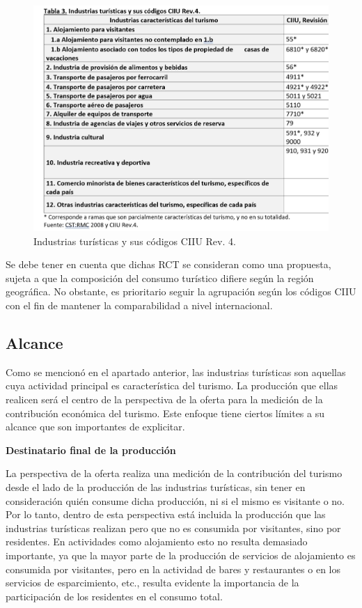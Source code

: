 \documentclass[
  openany]{book}
\begin{document}
\begin{figure}

{\centering \includegraphics[width=1\linewidth]{imagenes/figura1.2} 

}

\caption{Industrias turísticas y sus códigos CIIU Rev. 4.}\label{fig:ciiu2}
\end{figure}

Se debe tener en cuenta que dichas RCT se consideran como una propuesta, sujeta a que la composición del consumo turístico difiere según la región geográfica. No obstante, es prioritario seguir la agrupación según los códigos CIIU con el fin de mantener la comparabilidad a nivel internacional.

\hypertarget{alcance}{%
\subsection{Alcance}\label{alcance}}

Como se mencionó en el apartado anterior, las industrias turísticas son aquellas cuya actividad principal es característica del turismo. La producción que ellas realicen será el centro de la perspectiva de la oferta para la medición de la contribución económica del turismo. Este enfoque tiene ciertos límites a su alcance que son importantes de explicitar.

\textbf{Destinatario final de la producción}

La perspectiva de la oferta realiza una medición de la contribución del turismo desde el lado de la producción de las industrias turísticas, sin tener en consideración quién consume dicha producción, ni si el mismo es visitante o no. Por lo tanto, dentro de esta perspectiva está incluida la producción que las industrias turísticas realizan pero que no es consumida por visitantes, sino por residentes. En actividades como alojamiento esto no resulta demasiado importante, ya que la mayor parte de la producción de servicios de alojamiento es consumida por visitantes, pero en la actividad de bares y restaurantes o en los servicios de esparcimiento, etc., resulta evidente la importancia de la participación de los residentes en el consumo total.
\end{document}
